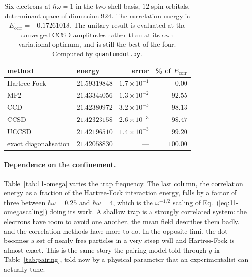 \begin{table}[h]
\centering
\renewcommand{\arraystretch}{1.25}
\setlength{\tabcolsep}{11pt}
\begin{tabular}{llrr}
\toprule
method & energy & error & \% of $E_{\mathrm{corr}}$\\
\midrule
Hartree-Fock          & $21.59319848$ & $1.7\times10^{-1}$ & $\phantom{00}0.00$\\
MP2                   & $21.43344056$ & $1.3\times10^{-2}$ & $\phantom{0}92.55$\\
CCD                   & $21.42380972$ & $3.2\times10^{-3}$ & $\phantom{0}98.13$\\
CCSD                  & $21.42323158$ & $2.6\times10^{-3}$ & $\phantom{0}98.47$\\
UCCSD                 & $21.42196510$ & $1.4\times10^{-3}$ & $\phantom{0}99.20$\\
\midrule
exact diagonalisation & $21.42058830$ & --- & $100.00$\\
\bottomrule
\end{tabular}
\caption{Six electrons at $\hbar\omega=1$ in the two-shell basis, $12$
spin-orbitals, determinant space of dimension $924$.  The correlation energy
is $E_{\mathrm{corr}}=-0.17261018$.  The unitary result is evaluated at the
converged CCSD amplitudes rather than at its own variational optimum, and is
still the best of the four.  Computed by \texttt{quantumdot.py}.}
\label{tab:11-sixelectron}
\end{table}

\paragraph{Dependence on the confinement.}
Table~\ref{tab:11-omega} varies the trap frequency.  The last column, the
correlation energy as a fraction of the Hartree-Fock interaction energy, falls
by a factor of three between $\hbar\omega=0.25$ and $\hbar\omega=4$, which is
the $\omega^{-1/2}$ scaling of Eq.~(\ref{eq:11-omegascaling}) doing its work.
A shallow trap is a strongly correlated system: the electrons have room to
avoid one another, the mean field describes them badly, and the correlation
methods have more to do.  In the opposite limit the dot becomes a set of
nearly free particles in a very steep well and Hartree-Fock is almost exact.
This is the same story the pairing model told through $g$ in
Table~\ref{tab:pairing}, told now by a physical parameter that an
experimentalist can actually tune.

